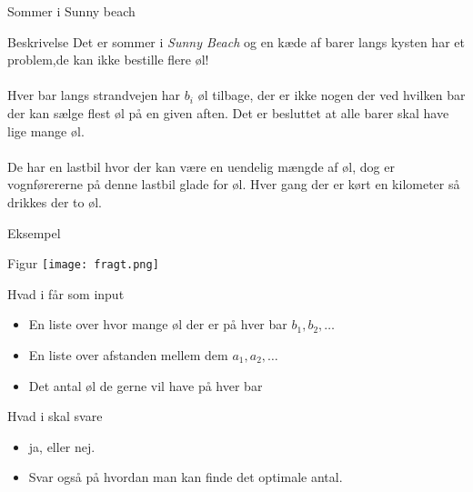 \documentclass[12pt,t]{beamer}
\begin{document}
    \begin{frame}[c]{Sommer i Sunny beach}
        \begin{block}{Beskrivelse}
          Det er sommer i \emph{Sunny Beach} og en kæde af barer langs kysten
          har et problem,\pause  de kan ikke bestille flere øl!
          \\
          \pause  ~ \\
          Hver bar langs strandvejen har $b_i$ øl tilbage, der er ikke
          nogen der ved hvilken bar der kan sælge flest øl på en given aften.
          \pause
          Det er besluttet at alle barer skal have lige mange øl. \\
          \pause
          ~\\
          De har en lastbil hvor der kan være en uendelig mængde af øl, \pause
          dog er vognførererne på denne lastbil glade for øl. Hver gang der er
          kørt en kilometer så drikkes der to øl.
        \end{block}
    \end{frame}

    \begin{frame}[c]{Eksempel}
        \begin{block}{Figur}
          \texttt{[image: fragt.png]}
        \end{block}
        \pause
        \begin{block}{Hvad i får som input}
          \begin{itemize}
            \item En liste over hvor mange øl der er på hver bar $b_1, b_2, \dots$
            \item En liste over afstanden mellem dem $a_1, a_2, \dots$ \pause
            \item Det antal øl de gerne vil have på hver bar \pause
          \end{itemize}
        \end{block}

        \begin{block}{Hvad i skal svare}
          \begin{itemize}
            \item ja, eller nej. \pause
            \item Svar også på hvordan man kan finde det optimale antal.
          \end{itemize}
        \end{block}
    \end{frame}
\end{document}
